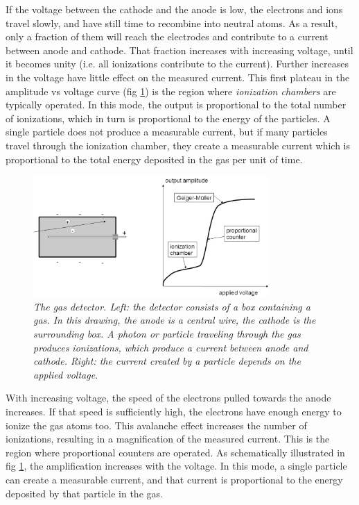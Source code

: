 \documentclass[11pt,oneside]{book}
\begin{document}
If the voltage between the cathode and the anode is low, the electrons
and ions travel slowly, and have still time to recombine into
neutral atoms. As a result, only a fraction of them will reach the
electrodes and contribute to a current between anode and cathode.
That fraction increases with
increasing voltage, until it becomes unity (i.e. all ionizations
contribute to the current). Further increases in the voltage have
little effect on the measured current. This first plateau in the
amplitude vs voltage curve (fig \ref{fig:gasdetector}) is the
region where {\em ionization chambers} are typically operated. In this mode,
the output is proportional to the total number of ionizations, which in
turn is proportional to the energy of the particles. A single particle
does not produce a measurable current, but if many particles travel
through the ionization chamber, they create a measurable current which
is proportional to the total energy deposited in the gas per unit of time.
%
\begin{figure}[thb]
\includegraphics[width=0.8\textwidth]{figs/fig_gasdetector.pdf}
\caption{\label{fig:gasdetector} \emph{The gas detector.
Left: the detector consists of a box containing a gas. In this drawing,
the anode is a central wire, the cathode is the surrounding box. A photon
or particle traveling through the gas produces ionizations, which produce
a current between anode and cathode. Right: the current created by
a particle depends on the applied voltage.}}
\end{figure}

With increasing voltage, the speed of the electrons pulled towards the
anode increases. If that speed is sufficiently high, the electrons
have enough energy to ionize the gas atoms too. This avalanche
effect increases the number of ionizations, resulting in a magnification
of the measured current. This is the region where proportional
counters are operated. As schematically illustrated in fig
\ref{fig:gasdetector}, the amplification increases with the voltage.
In this mode, a single particle can create a measurable current, and
that current is proportional to the energy deposited by that particle 
in the gas.
\end{document}
